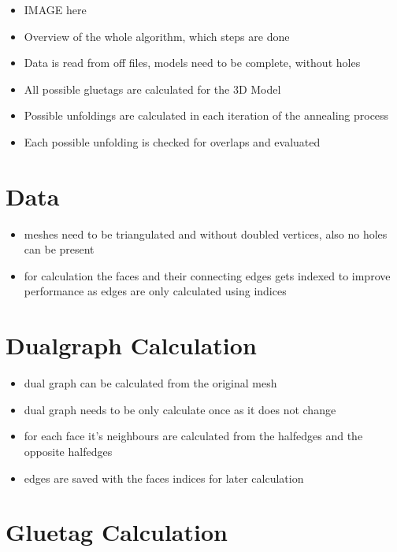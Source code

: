 \documentclass[draft,final]{vutinfth} %
\begin{document}
\begin{itemize}
	\item IMAGE here
	\item Overview of the whole algorithm, which steps are done
	\item Data is read from off files, models need to be complete, without holes
	\item All possible gluetags are calculated for the 3D Model
	\item Possible unfoldings are calculated in each iteration of the annealing process
	\item Each possible unfolding is checked for overlaps and evaluated
\end{itemize}

\section{Data}

\begin{itemize}
	\item meshes need to be triangulated and without doubled vertices, also no holes can be present
	\item for calculation the faces and their connecting edges gets indexed to improve performance as edges are only calculated using indices
\end{itemize}

\section{Dualgraph Calculation}

\begin{itemize}
	\item dual graph can be calculated from the original mesh 
	\item dual graph needs to be only calculate once as it does not change
	\item for each face it's neighbours are calculated from the halfedges and the opposite halfedges
	\item edges are saved with the faces indices for later calculation
\end{itemize}

\section{Gluetag Calculation}
\end{document}
